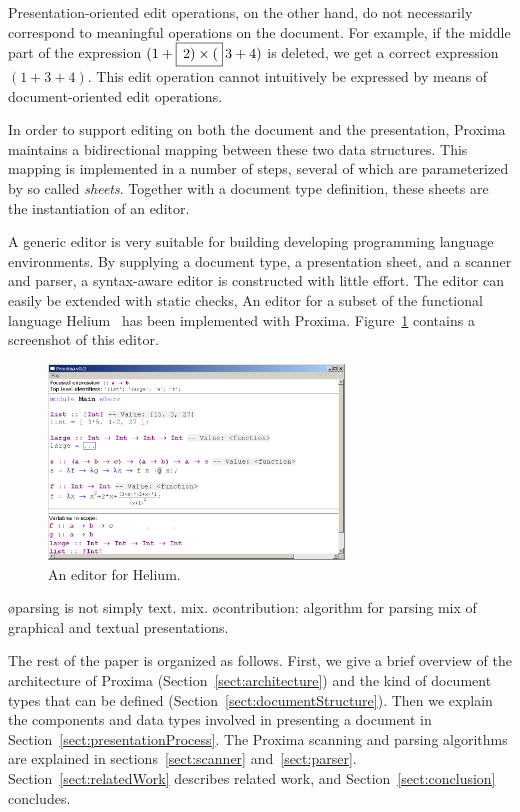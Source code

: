 \documentclass[12pt]{article}
\begin{document}
Presentation-oriented edit operations, on the other hand, do not necessarily correspond to meaningful operations on the document. For example, if the middle part of the expression $(1+\framebox{$\,2) \times ($}\,3+4)$ is deleted, we get a correct expression $(1+3+4)$. This edit operation cannot intuitively be expressed by means of document-oriented edit operations.


In order to support editing on both the document and the presentation, Proxima maintains a bidirectional mapping between these two data structures. This mapping is implemented in a number of steps, several of which are parameterized by so called {\em sheets}. Together with a document type definition, these sheets are the instantiation of an editor.


A generic editor is very suitable for building developing programming language environments. By supplying a document type, a presentation sheet, and a scanner and parser, a syntax-aware editor is constructed with little effort. The editor can easily be extended with static checks,
An editor for a subset of the functional language Helium~\cite{heeren03helium} has been implemented with Proxima. Figure~\ref{fig:heliumEditor} contains a screenshot of this editor. 

\begin{figure}[ht]
\centering
\includegraphics[width=0.7\textwidth]{images/HeliumEditor}
\caption{An editor for Helium.}
\label{fig:heliumEditor}
\end{figure}


\bl
\o parsing is not simply text. mix.
\o contribution: algorithm for parsing mix of graphical and textual presentations.
\el

The rest of the paper is organized as follows. First, we give a brief overview of the architecture of Proxima (Section~\ref{sect:architecture}) and the kind of document types that can be defined (Section~\ref{sect:documentStructure}). Then we explain the components and data types involved in presenting a document in Section~\ref{sect:presentationProcess}. The Proxima scanning and parsing algorithms are explained in sections~\ref{sect:scanner} and~\ref{sect:parser}. Section~\ref{sect:relatedWork} describes related work, and Section~\ref{sect:conclusion} concludes.
\end{document}
